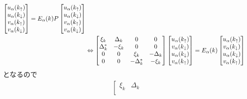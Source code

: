 \documentclass[dvipdfmx, 11pt, a4paper]{jsarticle}
\numberwithin{equation}{section}
\theoremstyle{definition}
\begin{document}
\begin{derivationBox}
\begin{align}
            \left[ 
            \begin{matrix}
                u_\alpha (k_\uparrow)\\
                u_\alpha (k_\downarrow)\\
                v_\alpha (k_\uparrow)\\
                v_\alpha (k_\downarrow)
            \end{matrix}
            \right] = E_\alpha(k)
            P\left[ 
            \begin{matrix}
                u_\alpha (k_\uparrow)\\
                u_\alpha (k_\downarrow)\\
                v_\alpha (k_\uparrow)\\
                v_\alpha (k_\downarrow)
            \end{matrix}
            \right] \notag \\
            &\Leftrightarrow \left[
            \begin{matrix}
                \xi_k&\Delta_k&0&0\\
                \Delta_k^*&-\xi_k&0&0\\
                0&0&\xi_k&-\Delta_k\\
                0&0&-\Delta_k^*&-\xi_k
            \end{matrix}
            \right]
            \left[ 
            \begin{matrix}
                u_\alpha (k_\uparrow)\\
                v_\alpha (k_\downarrow)\\
                u_\alpha (k_\downarrow)\\
                v_\alpha (k_\uparrow)
            \end{matrix}
            \right] = E_\alpha(k)
            \left[ 
            \begin{matrix}
                u_\alpha (k_\uparrow)\\
                v_\alpha (k_\downarrow)\\
                u_\alpha (k_\downarrow)\\
                v_\alpha (k_\uparrow)
            \end{matrix}
            \right]
        \end{align}
        となるので
        \begin{align}
            \left[
            \begin{matrix}
                \xi_k&\Delta_k\\

\end{matrix}
\end{align}
\end{derivationBox}
\end{document}
